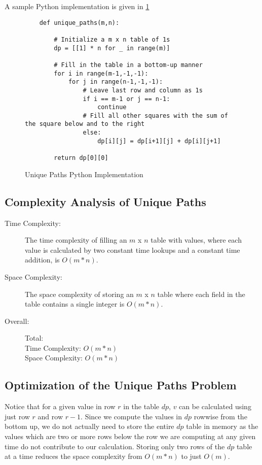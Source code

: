 A sample Python implementation is given in \ref{fig:unique-paths}
\begin{figure}[H]
    \centering
    \begin{lstlisting}
    def unique_paths(m,n):
    
        # Initialize a m x n table of 1s
        dp = [[1] * n for _ in range(m)]
    
        # Fill in the table in a bottom-up manner
        for i in range(m-1,-1,-1):
            for j in range(n-1,-1,-1):
                # Leave last row and column as 1s
                if i == m-1 or j == n-1:
                    continue
                # Fill all other squares with the sum of the square below and to the right
                else:
                    dp[i][j] = dp[i+1][j] + dp[i][j+1]

        return dp[0][0]
    \end{lstlisting}
    \caption{Unique Paths Python Implementation}
    \label{fig:unique-paths}
\end{figure}

\subsection{Complexity Analysis of Unique Paths}\label{ca-unique-paths}

\begin{description}
    \item[Time Complexity:]
        The time complexity of filling an $m$ x $n$ table with values,
        where each value is calculated by two constant time lookups and a constant time addition, is $O(m * n)$.
        
    \item[Space Complexity:] 
        The space complexity of storing an $m$ x $n$ table where each field in the table contains a single integer is $O(m * n)$.

    \item[Overall:] Total:\\
        Time Complexity: $O(m * n)$\\
        Space Complexity: $O(m * n)$
    
\end{description}

\subsection{Optimization of the Unique Paths Problem}
Notice that for a given value in row $r$ in the table $dp$, $v$ can be calculated using just row $r$ and row $r-1$.
Since we compute the values in $dp$ rowwise from the bottom up, we do not actually need to store the entire $dp$ table in memory as the values which are two or more rows below the row we are computing at any given time do not contribute to our calculation.
Storing only two rows of the $dp$ table at a time reduces the space complexity from $O(m * n)$ to just $O(m)$.

